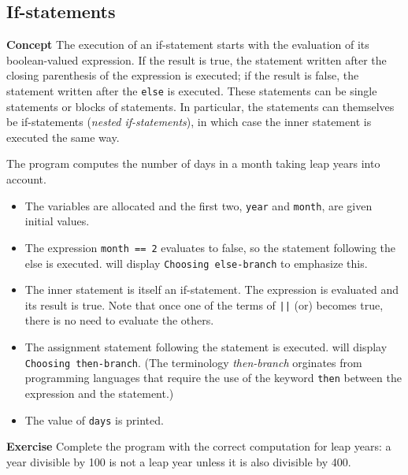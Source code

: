 \subsection{If-statements}\label{control.01}

\textbf{Concept} The execution of an if-statement starts with the evaluation of 
its boolean-valued expression. If the result is true, the statement written
after the closing parenthesis of the expression is executed; if the result is
false, the statement written after the \texttt{else} is executed. These statements
can be single statements or blocks of statements. In particular,
the statements can themselves be if-statements (\emph{nested if-statements}),
in which case the inner statement is executed the same way.


The program computes the number of days in a month taking leap years into account.

\begin{itemize}
\item The variables are allocated and the first two, \texttt{year} and \texttt{month}, are
given initial values.
\item The expression \texttt{month == 2} evaluates to false, so the statement
following the else is executed. \jel{} will display \texttt{Choosing else-branch} to 
emphasize this.
\item The inner statement is itself an if-statement. The expression is evaluated
and its result is true. Note that once one of the terms of \texttt{||} (or) becomes 
true, there is no need to evaluate the others.
\item The assignment statement following the statement is executed.
\jel{} will display \texttt{Choosing then-branch}. (The 
terminology \emph{then-branch} orginates from programming
languages that require the use of the keyword \texttt{then} between the expression
and the statement.)
\item The value of \texttt{days} is printed.
\end{itemize}

\textbf{Exercise} Complete the program with the correct computation
for leap years: a year divisible by 100 is not a leap year unless it
is also divisible by 400.

